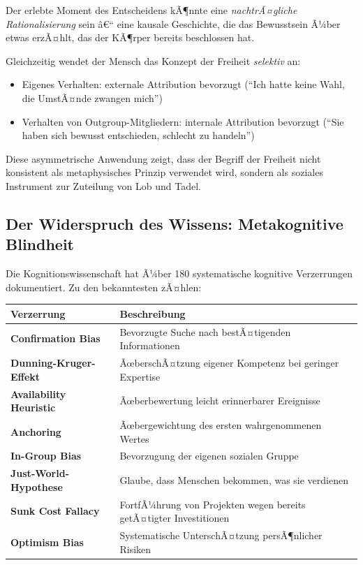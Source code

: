 ﻿\documentclass[12pt, a4paper]{article}
\begin{document}
Der erlebte Moment des Entscheidens kÃ¶nnte eine \emph{nachtrÃ¤gliche Rationalisierung}
sein â€“ eine kausale Geschichte, die das Bewusstsein Ã¼ber etwas erzÃ¤hlt, das der
KÃ¶rper bereits beschlossen hat.

Gleichzeitig wendet der Mensch das Konzept der Freiheit \emph{selektiv} an:
\begin{itemize}
  \item Eigenes Verhalten: externale Attribution bevorzugt
    (\enquote{Ich hatte keine Wahl, die UmstÃ¤nde zwangen mich})
  \item Verhalten von Outgroup-Mitgliedern: internale Attribution bevorzugt
    (\enquote{Sie haben sich bewusst entschieden, schlecht zu handeln})
\end{itemize}
Diese asymmetrische Anwendung zeigt, dass der Begriff der Freiheit nicht
konsistent als metaphysisches Prinzip verwendet wird, sondern als soziales
Instrument zur Zuteilung von Lob und Tadel.

\subsection{Der Widerspruch des Wissens: Metakognitive Blindheit}

Die Kognitionswissenschaft hat Ã¼ber 180 systematische kognitive Verzerrungen
dokumentiert. Zu den bekanntesten zÃ¤hlen:

\medskip
\begin{tabular}{>{\bfseries}p{4.5cm} p{8.5cm}}
\toprule
Verzerrung & Beschreibung \\
\midrule
Confirmation Bias & Bevorzugte Suche nach bestÃ¤tigenden Informationen \\
Dunning-Kruger-Effekt & ÃœberschÃ¤tzung eigener Kompetenz bei geringer Expertise \\
Availability Heuristic & Ãœberbewertung leicht erinnerbarer Ereignisse \\
Anchoring & Ãœbergewichtung des ersten wahrgenommenen Wertes \\
In-Group Bias & Bevorzugung der eigenen sozialen Gruppe \\
Just-World-Hypothese & Glaube, dass Menschen bekommen, was sie verdienen \\
Sunk Cost Fallacy & FortfÃ¼hrung von Projekten wegen bereits getÃ¤tigter Investitionen \\
Optimism Bias & Systematische UnterschÃ¤tzung persÃ¶nlicher Risiken \\
\bottomrule
\end{tabular}
\medskip
\end{document}
